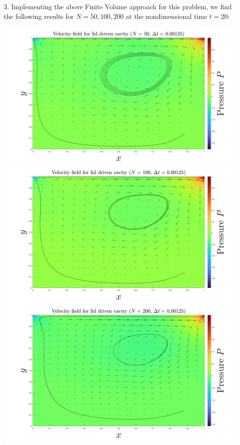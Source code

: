 \documentclass{article}
\begin{document}
\begin{itemize}
    \pagebreak
     \item[3.] Implementing the above Finite Volume approach for this problem, we find the following results for $N = 50,100,200$ at the nondimensional time $t = 20$:
    \begin{center}
        \includegraphics[scale = 0.13]{N_50.png}
        \includegraphics[scale = 0.13]{N_100.png}
        \includegraphics[scale = 0.18]{N_200.png}
    \end{center}



\end{itemize}
\end{document}
